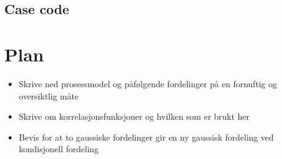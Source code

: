 \documentclass{report}
\begin{document}
\subsection{Case code}

\section{Plan}
\begin{itemize}
\item Skrive ned prosessmodel og påfølgende fordelinger på en fornuftig og oversiktlig måte
\item Skrive om korrelasjonsfunksjoner og hvilken som er brukt her 
\item Bevis for at to gaussiske fordelinger gir en ny gaussisk fordeling ved kondisjonell fordeling
\end{itemize}
\end{document}
